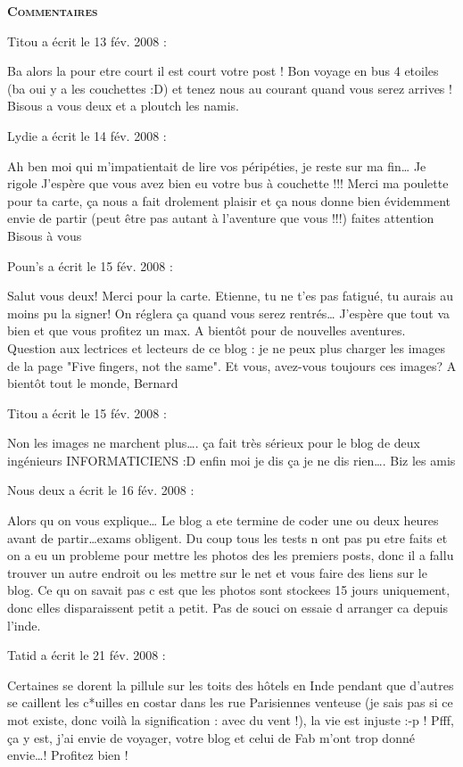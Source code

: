 \bigskip
\textbf{\textsc{Commentaires}}

\medskip
Titou a écrit le 13 fév. 2008 :
\begin{displayquote}
Ba alors la pour etre court il est court votre post ! Bon voyage en bus 4 etoiles (ba oui y a les couchettes :D) et tenez nous au courant quand vous serez arrives ! Bisous a vous deux et a ploutch les namis.
\end{displayquote}

\medskip
Lydie a écrit le 14 fév. 2008 :
\begin{displayquote}
Ah ben moi qui m'impatientait de lire vos péripéties, je reste sur ma fin\dots
Je rigole
J'espère que vous avez bien eu votre bus à couchette !!!
Merci ma poulette pour ta carte, ça nous a fait drolement plaisir et ça nous donne bien évidemment envie de partir (peut être pas autant à l'aventure que vous !!!)
faites attention
Bisous à vous
\end{displayquote}

\medskip
Poun's a écrit le 15 fév. 2008 :
\begin{displayquote}
Salut vous deux! Merci pour la carte. Etienne, tu ne t'es pas fatigué, tu aurais au moins pu la signer! On réglera ça quand vous serez rentrés\dots
J'espère que tout va bien et que vous profitez un max.
A bientôt pour de nouvelles aventures.
Question aux lectrices et lecteurs de ce blog : je ne peux plus charger les images de la page "Five fingers, not the same". Et vous, avez-vous toujours ces images?
A bientôt tout le monde, Bernard
\end{displayquote}

\medskip
Titou a écrit le 15 fév. 2008 :
\begin{displayquote}
Non les images ne marchent plus\dots. ça fait très sérieux pour le blog de deux ingénieurs INFORMATICIENS :D enfin moi je dis ça je ne dis rien\dots. Biz les amis
\end{displayquote}

\medskip
Nous deux a écrit le 16 fév. 2008 :
\begin{displayquote}
Alors qu on vous explique\dots
Le blog a ete termine de coder une ou deux heures avant de partir\dots exams obligent. Du coup tous les tests n ont pas pu etre faits et on a eu un probleme pour mettre les photos des les premiers posts, donc il a fallu trouver un autre endroit ou les mettre sur le net et vous faire des liens sur le blog. Ce qu on savait pas c est que les photos sont stockees 15 jours uniquement, donc elles disparaissent petit a petit. Pas de souci on essaie d arranger ca depuis l'inde.
\end{displayquote}

\medskip
Tatid a écrit le 21 fév. 2008 :
\begin{displayquote}
Certaines se dorent la pillule sur les toits des hôtels en Inde pendant que d'autres se caillent les c*uilles en costar dans les rue Parisiennes venteuse (je sais pas si ce mot existe, donc voilà la signification : avec du vent !), la vie est injuste :-p !
Pfff, ça y est, j'ai envie de voyager, votre blog et celui de Fab m'ont trop donné envie\dots ! Profitez bien !
\end{displayquote}

\vfill
